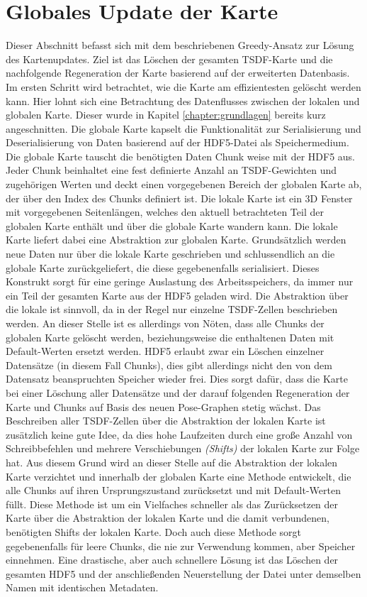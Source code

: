 \section{Globales Update der Karte}
\label{section:global_update}

Dieser Abschnitt befasst sich mit dem beschriebenen Greedy-Ansatz zur Lösung des Kartenupdates. Ziel ist das Löschen der gesamten TSDF-Karte und die nachfolgende Regeneration der Karte basierend auf der erweiterten Datenbasis. Im ersten Schritt wird betrachtet, wie die Karte am effizientesten gelöscht werden kann. Hier lohnt sich eine Betrachtung des Datenflusses zwischen der lokalen und globalen Karte. Dieser wurde in Kapitel \ref{chapter:grundlagen} bereits kurz angeschnitten. Die globale Karte kapselt die Funktionalität zur Serialisierung und Deserialisierung von Daten basierend auf der HDF5-Datei als Speichermedium. Die globale Karte tauscht die benötigten Daten Chunk weise mit der HDF5 aus. Jeder Chunk beinhaltet eine fest definierte Anzahl an TSDF-Gewichten und zugehörigen Werten und deckt einen vorgegebenen Bereich der globalen Karte ab, der über den Index des Chunks definiert ist. Die lokale Karte ist ein 3D Fenster mit vorgegebenen Seitenlängen, welches den aktuell betrachteten Teil der globalen Karte enthält und über die globale Karte wandern kann. Die lokale Karte liefert dabei eine Abstraktion zur globalen Karte. Grundsätzlich werden neue Daten nur über die lokale Karte geschrieben und schlussendlich an die globale Karte zurückgeliefert, die diese gegebenenfalls serialisiert. Dieses Konstrukt sorgt für eine geringe Auslastung des Arbeitsspeichers, da immer nur ein Teil der gesamten Karte aus der HDF5 geladen wird. Die Abstraktion über die lokale ist sinnvoll, da in der Regel nur einzelne TSDF-Zellen beschrieben werden. An dieser Stelle ist es allerdings von Nöten, dass alle Chunks der globalen Karte gelöscht werden, beziehungsweise die enthaltenen Daten mit Default-Werten ersetzt werden. HDF5 erlaubt zwar ein Löschen einzelner Datensätze (in diesem Fall Chunks), dies gibt allerdings nicht den von dem Datensatz beanspruchten Speicher wieder frei. Dies sorgt dafür, dass die Karte bei einer Löschung aller Datensätze und der darauf folgenden Regeneration der Karte und Chunks auf Basis des neuen Pose-Graphen stetig wächst. Das Beschreiben aller TSDF-Zellen über die Abstraktion der lokalen Karte ist zusätzlich keine gute Idee, da dies hohe Laufzeiten durch eine große Anzahl von Schreibbefehlen und mehrere Verschiebungen \emph{(Shifts)} der lokalen Karte zur Folge hat. Aus diesem Grund wird an dieser Stelle auf die Abstraktion der lokalen Karte verzichtet und innerhalb der globalen Karte eine Methode entwickelt, die alle Chunks auf ihren Ursprungszustand zurücksetzt und mit Default-Werten füllt. Diese Methode ist um ein Vielfaches schneller als das Zurücksetzen der Karte über die Abstraktion der lokalen Karte und die damit verbundenen, benötigten Shifts der lokalen Karte. Doch auch diese Methode sorgt gegebenenfalls für leere Chunks, die nie zur Verwendung kommen, aber Speicher einnehmen. Eine drastische, aber auch schnellere Lösung ist das Löschen der gesamten HDF5 und der anschließenden Neuerstellung der Datei unter demselben Namen mit identischen Metadaten. 